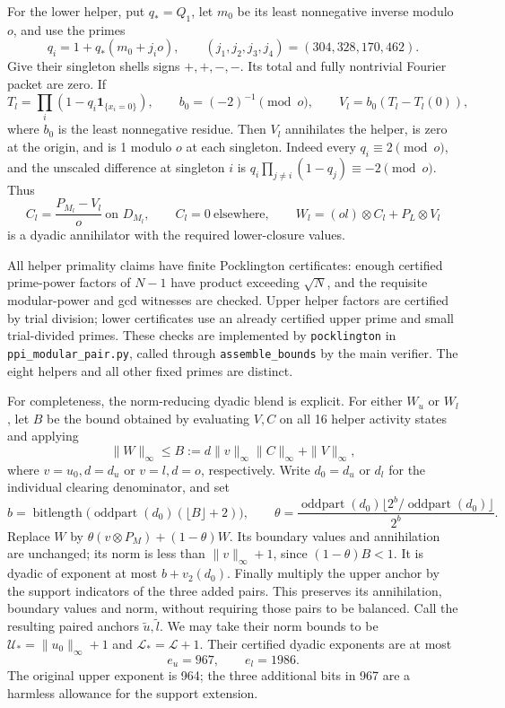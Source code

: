 \documentclass[11pt]{article}
\numberwithin{equation}{section}
\theoremstyle{definition}
\theoremstyle{remark}
\newcommand{\ind}{\mathbf1}
\begin{document}
For the lower helper, put $q_*=Q_1$, let $m_0$ be its least nonnegative
inverse modulo $o$, and use the primes
\[
 q_i=1+q_*(m_0+j_i o),\qquad (j_1,j_2,j_3,j_4)=(304,328,170,462).
\]
Give their singleton shells signs $+,+,-,-$.  Its total and fully
nontrivial Fourier packet are zero.  If
\[
 T_l=\prod_i(1-q_i\ind_{\{x_i=0\}}),\qquad
 b_0=(-2)^{-1}\pmod o,\qquad V_l=b_0(T_l-T_l(0)),
\]
where $b_0$ is the least nonnegative residue. Then $V_l$ annihilates the helper, is zero at the origin, and is 1 modulo
$o$ at each singleton.  Indeed every $q_i\equiv2\pmod o$, and the
unscaled difference at singleton $i$ is
$q_i\prod_{j\ne i}(1-q_j)\equiv-2\pmod o$.  Thus
\[
 C_l=\frac{P_{M_l}-V_l}{o}\ \text{on }D_{M_l},\qquad C_l=0
 \ \text{elsewhere},\qquad
 W_l=(o l)\otimes C_l+P_L\otimes V_l
\]
is a dyadic annihilator with the required lower-closure values.

All helper primality claims have finite Pocklington certificates: enough
certified prime-power factors of $N-1$ have product exceeding $\sqrt N$,
and the requisite modular-power and gcd witnesses are checked.  Upper
helper factors are certified by trial division; lower certificates use
an already certified upper prime and small trial-divided primes.  These
checks are implemented by \texttt{pocklington} in
\texttt{ppi\_modular\_pair.py}, called through \texttt{assemble\_bounds}
by the main verifier.  The eight helpers and all other fixed primes are
distinct.

For completeness, the norm-reducing dyadic blend is explicit.  For
either $W_u$ or $W_l$, let $B$ be the bound obtained by evaluating $V,C$
on all 16 helper activity states and applying
\[
 \|W\|_\infty\le B:=d\|v\|_\infty\|C\|_\infty+\|V\|_\infty,
\]
where $v=u_0,d=d_u$ or $v=l,d=o$, respectively.  Write $d_0=d_u$ or
$d_l$ for the individual clearing denominator, and set
\[
 b=\operatorname{bitlength}\bigl(
       \operatorname{oddpart}(d_0)(\lfloor B\rfloor+2)\bigr),
 \qquad
 \theta=\frac{\operatorname{oddpart}(d_0)
        \lfloor2^b/\operatorname{oddpart}(d_0)\rfloor}{2^b}.
\]
Replace $W$ by $\theta(v\otimes P_M)+(1-\theta)W$.  Its boundary
values and annihilation are unchanged; its norm is less than
$\|v\|_\infty+1$, since $(1-\theta)B<1$.  It is dyadic of exponent
at most $b+v_2(d_0)$.  Finally multiply the upper anchor by the support
indicators of the three added pairs.  This preserves its annihilation,
boundary values and norm, without requiring those pairs to be balanced.
Call the resulting paired anchors $\widetilde u,\widetilde l$.  We may
take their norm bounds to be
$\mathcal U_*=\|u_0\|_\infty+1$ and $\mathcal L_*=\mathcal L+1$.
Their certified dyadic exponents
are at most
\begin{equation}\label{h100:anchor-exponents}
 e_u=967,\qquad e_l=1986.
\end{equation}
The original upper exponent is 964; the three additional bits in 967
are a harmless allowance for the support extension.
\end{document}
